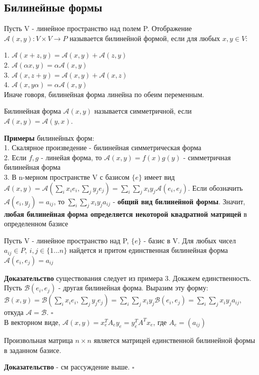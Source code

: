 \subsection{Билинейные формы}
\begin{defin}
Пусть V - линейное пространство над полем P. Отображение $\mathcal A(x,y)
\colon V\times V\to P$ называется билинейной формой, если для любых $x,y\in V$: 
\end{defin}
1. $\mathcal A(x+z,y)=\mathcal A(x,y)+\mathcal A(z,y)$\\
2. $\mathcal A(\alpha x,y)=\alpha\mathcal A(x,y)$\\
3. $\mathcal A(x,z+y)=\mathcal A(x,y)+\mathcal A(x,z)$\\
4. $\mathcal A(x,y\alpha)=\alpha\mathcal A(x,y)$\\
Иначе говоря, билинейная форма линейна по обеим переменным.
\begin{defin}
Билинейная форма $\mathcal A(x,y)$ называется симметричной, если 
$\mathcal A(x,y)=\mathcal A(y,x)$.
\end{defin}
\textbf{Примеры} билинейных форм: \\
1. Скалярное произведение - билинейная симметрическая форма\\
2. Если $f,g$ - линейая форма, то $\mathcal A(x,y)=f(x)g(y)$ - симметричная 
билинейная форма\\
3. В n-мерном пространстве V с базисом $\{e\}$ имеет вид $\mathcal A(x,y)=
\mathcal A(\sum_i x_ie_i,\sum_j y_je_j)=\sum_i\sum_jx_iy_j\mathcal A(e_i,e_j)$.
Если
обозначить $\mathcal A(e_i,y_j)=a_{ij}$, то $\sum_i\sum_jx_iy_ja_{ij}$ - 
\textbf{общий вид билинейной формы}. Значит, \textbf{любая билинейная форма
определяется некоторой квадратной матрицей} в определенном базисе
\begin{theor}
Пусть V - линейное пространство над P, $\{e\}$ - базис в V. Для любых чисел 
$a_{ij}\in P,~i,j\in\{1...n\}$ найдется и притом единственная билинейная форма
$\mathcal A(e_i,e_j)=a_{ij}$
\end{theor}
\textbf{Доказательство} существования следует из примера 3. Докажем 
единственность. Пусть $\mathcal B(e_i,e_j)$ - другая билинейная форма. 
Выразим эту
форму: $\mathcal B(x,y)=\mathcal B(\sum_i x_ie_i,\sum_j y_je_j)=
\sum_i\sum_jx_iy_j\mathcal B(e_i,e_j)=\sum_i\sum_jx_iy_ja_{ij}$, откуда
$\mathcal A=\mathcal B$. $\square$\\
В векторном виде, $\mathcal A(x,y)=x_e^TA_ey_e=y_e^TA^Tx_e$, где $A_e=(a_{ij})$
\begin{theor}
Произвольная матрица $n\times n$ является матрицей единственной билинейной 
формы в заданном базисе.
\end{theor}
\textbf{Доказательство} - см рассуждение выше. $\square$

